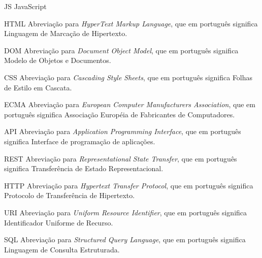 \documentclass[
	12pt,				%
	openright,			%
	twoside,			%
	a4paper,			%
	english,			%
	brazil				%
	]{abntex2}
\begin{document}
\begin{siglas}
  \item[JS] JavaScript
  \item[HTML] Abreviação para \textit{HyperText Markup Language}, que em português significa Linguagem de Marcação de Hipertexto.
  \item[DOM] Abreviação para \textit{Document Object Model}, que em português significa Modelo de Objetos e Documentos.
  \item[CSS] Abreviação para \textit{Cascading Style Sheets}, que em português significa Folhas de Estilo em Cascata.
  \item[ECMA] Abreviação para \textit{European Computer Manufacturers Association}, que em português significa Associação Européia de Fabricantes de Computadores.
  \item[API] Abreviação para \textit{Application Programming Interface}, que em português significa Interface de programação de aplicações.
  \item[REST] Abreviação para \textit{Representational State Transfer}, que em português significa Transferência de Estado Representacional.
  \item[HTTP] Abreviação para \textit{Hypertext Transfer Protocol}, que em português significa Protocolo de Transferência de Hipertexto.
  \item[URI] Abreviação para \textit{Uniform Resource Identifier}, que em português significa Identificador Uniforme de Recurso.
  \item[SQL] Abreviação para \textit{Structured Query Language}, que em português significa Linguagem de Consulta Estruturada.
\end{siglas}


\tableofcontents*
\cleardoublepage


\textual
\end{document}
